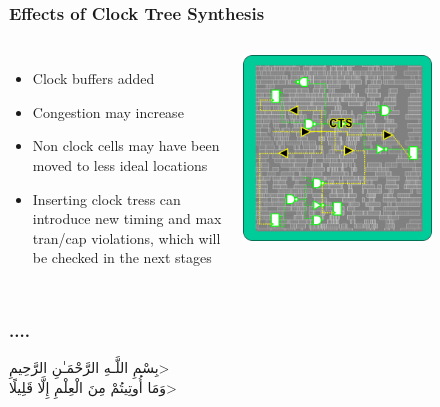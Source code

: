 \documentclass[compress]{beamer}
\begin{document}
\begin{frame}
	\frametitle{Effects of Clock Tree Synthesis}
	\begin{columns}	
		\begin{itemize}
			\item Clock buffers added
			\item Congestion may increase
			\item Non clock cells may have been moved to less ideal locations
			\item Inserting clock tress can introduce new timing and max tran/cap violations, which will be checked in the next stages
		\end{itemize}
		\begin{center}
			\includegraphics[width=0.7\textwidth]{CTS01}
		\end{center}
	\end{columns}
\end{frame}
\begin{frame}
	\frametitle{....}
	\begin{center}
		\<بِسْمِ اللَّـهِ الرَّحْمَـٰنِ الرَّحِيمِ> \\
		\<وَمَا أُوتِيتُمْ مِنَ الْعِلْمِ إِلَّا قَلِيلًا>
		
	\end{center}
\end{frame}
\end{document}
